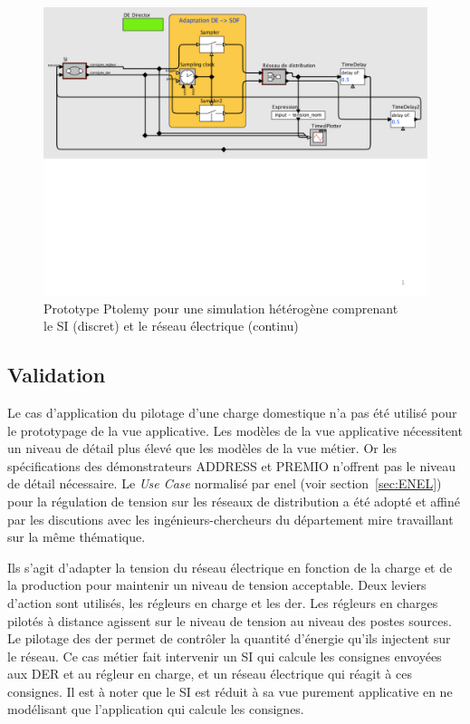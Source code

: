 \begin{figure}[!ht]
  \centering
  \includegraphics[trim = 0cm 8cm 0cm 0cm, clip, width=1\textwidth]{figures/6_methodologie/simu_ptolemy.pdf}
  \caption{Prototype Ptolemy pour une simulation hétérogène comprenant \\
           le SI (discret) et le réseau électrique (continu)}
 \label{fig:simu_ptolemy}
\end{figure}
		
\subsection{Validation}
Le cas d'application du pilotage d'une charge domestique n'a pas été utilisé pour le prototypage de la vue applicative. Les modèles de la vue applicative nécessitent un niveau de détail plus élevé que les modèles de la vue métier. Or les spécifications des démonstrateurs ADDRESS et PREMIO n'offrent pas le niveau de détail nécessaire. Le \textit{Use Case} normalisé par \gls{enel} (voir section~\ref{sec:ENEL}) pour la régulation de tension sur les réseaux de distribution a été adopté et affiné par les discutions avec les ingénieurs-chercheurs du département \gls{mire} travaillant sur la même thématique. 
		
Ils s'agit d'adapter la tension du réseau électrique en fonction de la charge et de la production pour maintenir un niveau de tension acceptable. Deux leviers d'action sont utilisés, les régleurs en charge et les \gls{der}. Les régleurs en charges pilotés à distance agissent sur le niveau de tension au niveau des postes sources. Le pilotage des \gls{der} permet de contrôler la quantité d'énergie qu'ils injectent sur le réseau. Ce cas métier fait intervenir un SI qui calcule les consignes envoyées aux DER et au régleur en charge, et un réseau électrique qui réagit à ces consignes. Il est à noter que le SI est réduit à sa vue purement applicative en ne modélisant que l'application qui calcule les consignes.
		
